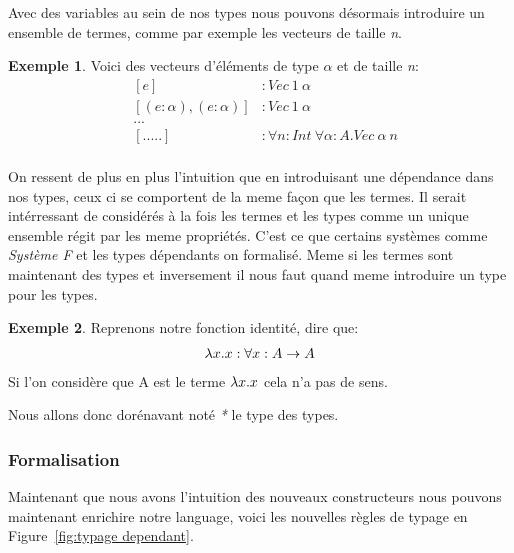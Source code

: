 \documentclass {article}
\theoremstyle{definition}
\newtheorem{example}{Exemple}
\theoremstyle{remark}
\begin{document}
Avec des variables au sein de nos types nous pouvons désormais introduire un ensemble de termes, 
comme par exemple les vecteurs de taille \emph{n}.
\begin{example}  
  \label{example vecteur}
  Voici des vecteurs d'éléments de type $\alpha$ et de taille \emph{n}:
  \begin{align*}
    &[e] &: Vec\: 1\: \alpha \\
    &[(e:\alpha),(e:\alpha)] &: Vec\: 1\: \alpha \\
    &... \\
    &[.....] &: \forall n:Int\: \forall \alpha : A . Vec\: \alpha \: n \\
  \end{align*}
\end{example}
On ressent de plus en plus l'intuition que en introduisant une dépendance dans nos types, ceux ci se comportent de la meme façon que 
les termes.
Il serait intérressant de considérés à la fois les termes et les types comme un unique ensemble régit par les meme propriétés.
C'est ce que certains systèmes comme \emph{Système F} et les types dépendants on formalisé. 
Meme si les termes sont maintenant des types et inversement il nous faut quand meme introduire un type pour les types.
\begin{example}
  Reprenons notre fonction identité, dire que:
  \begin{align*}
    \lambda x. x : \forall x:A \rightarrow A
  \end{align*}
  Si l'on considère que A est le terme $\lambda x. x$ cela n'a pas de sens.
\end{example}
Nous allons donc dorénavant noté \emph{*} le type des types.

\subsubsection{Formalisation}

Maintenant que nous avons l'intuition des nouveaux constructeurs nous pouvons maintenant enrichire notre language,
voici les nouvelles règles de typage en Figure~\ref{fig:typage dependant}.
\end{document}
